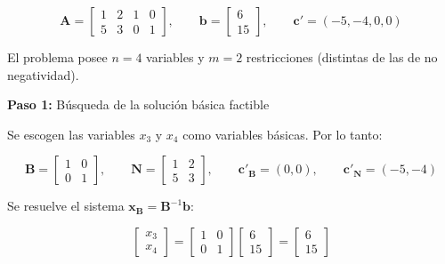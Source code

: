\begin{enumerate}
\begin{equation}
    \mathbf{A}
    =
    \begin{bmatrix}
        1 & 2 & 1 & 0 \\
        5 & 3 & 0 & 1
    \end{bmatrix},
    \qquad
    \mathbf{b}
    =
    \begin{bmatrix}
        6 \\
        15
    \end{bmatrix},
    \qquad
    \mathbf{c}' = (-5,-4,0,0)
\end{equation}

El problema posee $n=4$ variables y $m=2$ restricciones (distintas de las de no negatividad).


\textbf{Paso 1:} Búsqueda de la solución básica factible

    Se escogen las variables $x_3$ y $x_4$ como variables básicas. Por lo tanto:

    \begin{equation}
        \mathbf{B}
        =
        \begin{bmatrix}
            1 & 0 \\
            0 & 1
        \end{bmatrix},
        \qquad
        \mathbf{N}
        =
        \begin{bmatrix}
            1 & 2 \\
            5 & 3
        \end{bmatrix},
        \qquad
        \mathbf{c}'_{\mathbf{B}} = (0,0),
        \qquad
        \mathbf{c}'_{\mathbf{N}} = (-5,-4)
    \end{equation}

    Se resuelve el sistema $\mathbf{x}_{\mathbf{B}} = \mathbf{B}^{-1}\mathbf{b}$:

    \begin{equation}
        \begin{bmatrix}
            x_3 \\
            x_4
        \end{bmatrix}
        =
        \begin{bmatrix}
            1 & 0 \\
            0 & 1
        \end{bmatrix}
        \begin{bmatrix}
            6 \\
            15
        \end{bmatrix}
        =
        \begin{bmatrix}
            6 \\
            15
        \end{bmatrix}
    \end{equation}


\end{enumerate}

